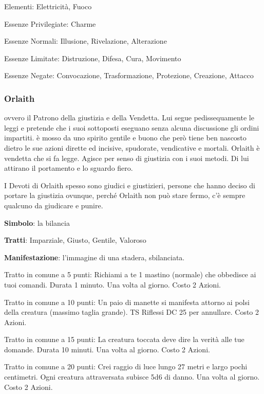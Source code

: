 \documentclass[a4paper,11pt,twoside,openany]{book}
\begin{document}
{\bigskip

Elementi: Elettricità, Fuoco

\bigskip

Essenze Privilegiate: Charme

Essenze Normali: Illusione, Rivelazione, Alterazione

Essenze Limitate: Distruzione, Difesa, Cura, Movimento

Essenze Negate: Convocazione, Trasformazione, Protezione, Creazione, Attacco

\subsubsection{Orlaith}

\label{orlaith}

ovvero il Patrono della giustizia e della Vendetta. Lui segue pedissequamente le leggi e pretende che i suoi sottoposti eseguano senza alcuna discussione gli ordini impartiti. è mosso da uno spirito gentile e buono che però tiene ben nascosto dietro le sue azioni dirette ed incisive, spudorate, vendicative e mortali. Orlaith è vendetta che si fa legge. Agisce per senso di giustizia con i suoi metodi. Di lui attirano il portamento e lo sguardo fiero.

I Devoti di Orlaith spesso sono giudici e giustizieri, persone che hanno deciso di portare la giustizia ovunque, perché Orlaith non può stare fermo, c'è sempre qualcuno da giudicare e punire.

\textbf{Simbolo}: la bilancia

\textbf{Tratti}: Imparziale, Giusto, Gentile, Valoroso

\textbf{Manifestazione}: l'immagine di una stadera, sbilanciata.

\bigskip

Tratto in comune a 5 punti: Richiami a te 1 mastino (normale) che obbedisce ai tuoi comandi. Durata 1 minuto. Una volta al giorno. Costo 2 Azioni.

Tratto in comune a 10 punti: Un paio di manette si manifesta attorno ai polsi della creatura (massimo taglia grande). TS Riflessi DC 25 per annullare. Costo 2 Azioni.

Tratto in comune a 15 punti: La creatura toccata deve dire la verità alle tue domande. Durata 10 minuti. Una volta al giorno. Costo 2 Azioni.

Tratto in comune a 20 punti: Crei raggio di luce lungo 27 metri e largo pochi centimetri. Ogni creatura attraversata subisce 5d6 di danno. Una volta al giorno. Costo 2 Azioni.

}
\end{document}
